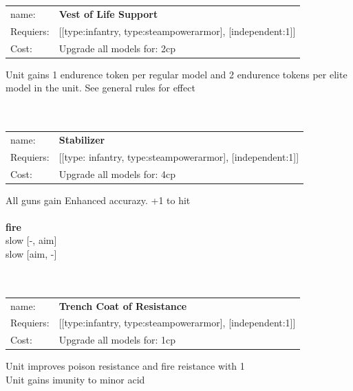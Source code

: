 \ \\
\ \\
\begin{tabular}{ll}
name: & {\bf Vest of Life Support } \\
Requiers: & [[type:infantry, type:steampowerarmor], [independent:1]] \\
Cost: & Upgrade all models for: 2cp \\
\end{tabular}

Unit gains 1 endurence token per regular model  and 2 endurence tokens per elite model in the unit. See general rules for effect\\ 









\ \\
\ \\
\begin{tabular}{ll}
name: & {\bf Stabilizer } \\
Requiers: & [[type: infantry, type:steampowerarmor], [independent:1]] \\
Cost: & Upgrade all models for: 4cp \\
\end{tabular}

All guns gain Enhanced accurazy. +1 to hit\\ 








\ \\ {\bf fire } \\
slow [-, aim] \\
slow [aim, -] \\

\ \\
\ \\
\begin{tabular}{ll}
name: & {\bf Trench Coat of Resistance } \\
Requiers: & [[type:infantry, type:steampowerarmor], [independent:1]] \\
Cost: & Upgrade all models for: 1cp \\
\end{tabular}

Unit improves poison resistance and fire reistance with 1\\ 
Unit gains imunity to minor acid\\ 









